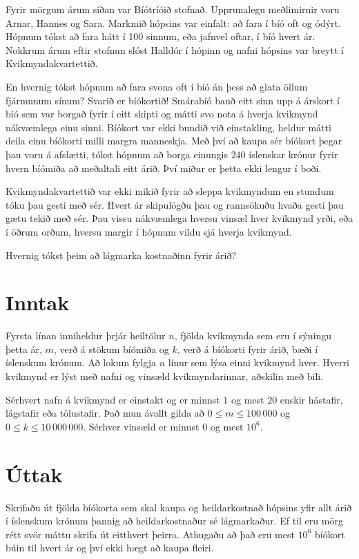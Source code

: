 
Fyrir mörgum árum síðan var Bíótríóið stofnað.
Upprunalegu meðlimirnir voru Arnar, Hannes og Sara.
Markmið hópsins var einfalt: að fara í bíó oft og ódýrt.
Hópnum tókst að fara hátt í 100 sinnum, eða jafnvel oftar, í bíó hvert ár.
Nokkrum árum eftir stofnun slóst Halldór í hópinn og nafni hópsins var breytt í Kvikmyndakvartettið.

En hvernig tókst hópnum að fara svona oft í bíó án þess að glata öllum fjármunum sínum?
Svarið er bíókortið!
Smárabíó bauð eitt sinn upp á árskort í bíó sem var borgað fyrir í eitt skipti og mátti svo nota á hverja kvikmynd nákvæmlega einu sinni.
Bíókort var ekki bundið við einstakling, heldur mátti deila einu bíókorti milli margra manneskja.
Með því að kaupa sér bíókort þegar þau voru á afslætti, tókst hópnum að borga einungis $240$ íslenskar krónur fyrir hvern bíómiða að meðaltali eitt árið.
Því miður er þetta ekki lengur í boði.

Kvikmyndakvartettið var ekki mikið fyrir að sleppa kvikmyndum en stundum tóku þau gesti með sér.
Hvert ár skipulögðu þau og rannsökuðu hvaða gesti þau gætu tekið með sér.
Þau vissu nákvæmlega hversu vinsæl hver kvikmynd yrði, 
eða í öðrum orðum, hversu margir í hópnum vildu sjá hverja kvikmynd.

Hvernig tókst þeim að lágmarka kostnaðinn fyrir árið?

\section*{Inntak}
Fyrsta línan inniheldur þrjár heiltölur $n$, fjölda kvikmynda sem eru í sýningu þetta ár, $m$, verð á stökum bíómiða og $k$, verð á bíókorti fyrir árið, bæði í íslenskum krónum.
Að lokum fylgja $n$ línur sem lýsa einni kvikmynd hver.
Hverri kvikmynd er lýst með nafni og vinsæld kvikmyndarinnar, aðskilin með bili.

Sérhvert nafn á kvikmynd er einstakt og er minnst $1$ og mest $20$ enskir hástafir, lágstafir eða tölustafir.
Það mun ávallt gilda að $0 \leq m \leq 100\,000$ og $0 \leq k \leq 10\,000\,000$.
Sérhver vinsæld er minnst $0$ og mest $10^6$.

\section*{Úttak}
Skrifaðu út fjölda bíókorta sem skal kaupa og heildarkostnað hópsins yfir allt árið í íslenskum krónum þannig að heildarkostnaður sé lágmarkaður.
Ef til eru mörg rétt svör máttu skrifa út eitthvert þeirra.
Athugaðu að það eru mest $10^6$ bíókort búin til hvert ár og því ekki hægt að kaupa fleiri.

